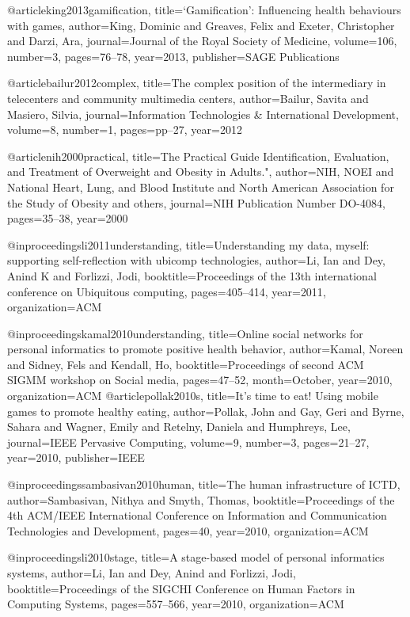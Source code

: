 @article{king2013gamification,
  title={‘Gamification’: Influencing health behaviours with games},
  author={King, Dominic and Greaves, Felix and Exeter, Christopher and Darzi, Ara},
  journal={Journal of the Royal Society of Medicine},
  volume={106},
  number={3},
  pages={76--78},
  year={2013},
  publisher={SAGE Publications}
}


@article{bailur2012complex,
  title={The complex position of the intermediary in telecenters and community multimedia centers},
  author={Bailur, Savita and Masiero, Silvia},
  journal={Information Technologies \& International Development},
  volume={8},
  number={1},
  pages={pp--27},
  year={2012}
}


@article{nih2000practical,
  title={The Practical Guide Identification, Evaluation, and Treatment of Overweight and Obesity in Adults."},
  author={NIH, NOEI and National Heart, Lung, and Blood Institute and North American Association for the Study of Obesity and others},
  journal={NIH Publication Number DO-4084},
  pages={35--38},
  year={2000}
}

@inproceedings{li2011understanding,
  title={Understanding my data, myself: supporting self-reflection with ubicomp technologies},
  author={Li, Ian and Dey, Anind K and Forlizzi, Jodi},
  booktitle={Proceedings of the 13th international conference on Ubiquitous computing},
  pages={405--414},
  year={2011},
  organization={ACM}
}

@inproceedings{kamal2010understanding,
  title={Online social networks for personal informatics to promote positive health behavior},
  author={Kamal, Noreen and Sidney, Fels and Kendall, Ho},
  booktitle={Proceedings of second ACM SIGMM workshop on Social media},
  pages={47--52},
  month={October},
  year={2010},
  organization={ACM}
}@article{pollak2010s,
  title={It's time to eat! Using mobile games to promote healthy eating},
  author={Pollak, John and Gay, Geri and Byrne, Sahara and Wagner, Emily and Retelny, Daniela and Humphreys, Lee},
  journal={IEEE Pervasive Computing},
  volume={9},
  number={3},
  pages={21--27},
  year={2010},
  publisher={IEEE}
}


@inproceedings{sambasivan2010human,
  title={The human infrastructure of ICTD},
  author={Sambasivan, Nithya and Smyth, Thomas},
  booktitle={Proceedings of the 4th ACM/IEEE International Conference on Information and Communication Technologies and Development},
  pages={40},
  year={2010},
  organization={ACM}
}

@inproceedings{li2010stage,
  title={A stage-based model of personal informatics systems},
  author={Li, Ian and Dey, Anind and Forlizzi, Jodi},
  booktitle={Proceedings of the SIGCHI Conference on Human Factors in Computing Systems},
  pages={557--566},
  year={2010},
  organization={ACM}
}


